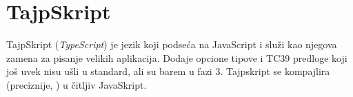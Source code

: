 \chapter{TajpSkript}

TajpSkript (\textsl{TypeScript}) je jezik koji podseća na JavaScript i služi kao njegova zamena za pisanje velikih aplikacija.
Dodaje opcione tipove i TC39 predloge koji još uvek nisu ušli u standard, ali su barem u fazi 3.
Tajpskript se kompajlira (preciznije, ) u čitljiv JavaSkript.






